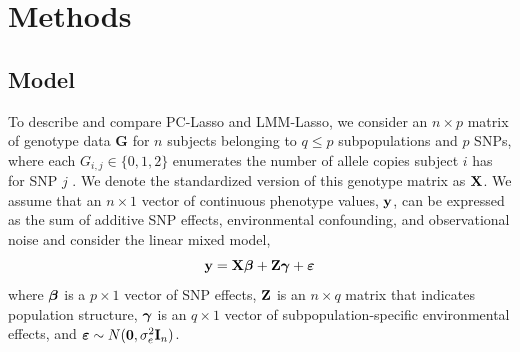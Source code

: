 \section{Methods} \label{sec:methods}



\subsection{Model}



To describe and compare PC-Lasso and LMM-Lasso, we consider an $n \times p$ matrix of genotype data $\boldsymbol{G}$ for $n$ subjects belonging to $q \le p$ subpopulations and $p$ SNPs, where each $G_{i,j} \in \{ 0, 1, 2 \}$ enumerates the number of allele copies subject $i$ has for SNP $j$  . We denote the standardized version   of this genotype matrix as $\textbf{X}$. We assume that an $n \times 1$ vector of continuous phenotype values, $\textbf{y}$, can be expressed as the sum of additive SNP effects, environmental confounding, and observational noise and consider the linear mixed model,
\begin{equation}
    \label{eqn:model}
    \textbf{y} = \textbf{X}\boldsymbol{\beta} + \textbf{Z}\boldsymbol{\gamma} + \boldsymbol{\varepsilon}
\end{equation}
where $\boldsymbol{\beta}$ is a $p \times 1$ vector of SNP effects, $\textbf{Z}$ is an $n \times q$ matrix that indicates population structure, $\boldsymbol{\gamma}$ is an $q \times 1$ vector of subpopulation-specific environmental effects, and $\boldsymbol{\varepsilon} \sim N(\boldsymbol{0}, \sigma^2_e \textbf{I}_n)$.

